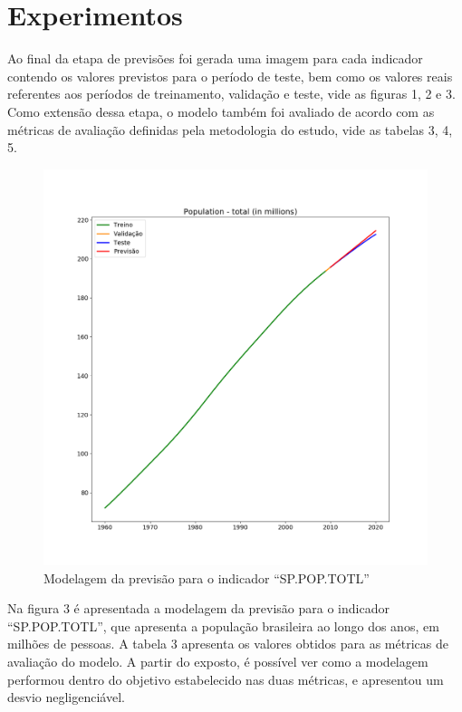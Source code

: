 \section{Experimentos}

Ao final da etapa de previsões foi gerada uma imagem para cada indicador contendo os 
valores previstos para o período de teste, bem como os valores reais referentes aos 
períodos de treinamento, validação e teste, vide as figuras 1, 2 e 3.  Como extensão 
dessa etapa, o modelo também foi avaliado de acordo com as métricas de avaliação 
definidas pela metodologia do estudo, vide as tabelas 3, 4, 5.

\begin{figure}[H]
    \centering
    \includegraphics[scale=0.35]{images/Figure_1}
    \caption{Modelagem da previsão para o indicador “SP.POP.TOTL”}
\end{figure}

Na figura 3 é apresentada a modelagem da previsão para o indicador “SP.POP.TOTL”, que apresenta a população 
brasileira ao longo dos anos, em milhões de pessoas. A tabela 3 apresenta os valores 
obtidos para as métricas de avaliação do modelo. A partir do exposto, é possível ver como a 
modelagem performou dentro do objetivo estabelecido nas duas métricas, e apresentou um desvio negligenciável.


